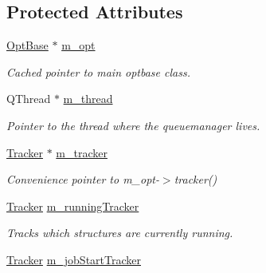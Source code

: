 \subsection*{Protected Attributes}
\begin{DoxyCompactItemize}
\item 
\hypertarget{classGlobalSearch_1_1QueueManager_a73408b74ae38d28709cc86211e569b66}{\hyperlink{classGlobalSearch_1_1OptBase}{Opt\-Base} $\ast$ \hyperlink{classGlobalSearch_1_1QueueManager_a73408b74ae38d28709cc86211e569b66}{m\-\_\-opt}}\label{classGlobalSearch_1_1QueueManager_a73408b74ae38d28709cc86211e569b66}

\begin{DoxyCompactList}\small\item\em Cached pointer to main optbase class. \end{DoxyCompactList}\item 
\hypertarget{classGlobalSearch_1_1QueueManager_aad3c44dad7c196ee965cdf4e1c66322c}{Q\-Thread $\ast$ \hyperlink{classGlobalSearch_1_1QueueManager_aad3c44dad7c196ee965cdf4e1c66322c}{m\-\_\-thread}}\label{classGlobalSearch_1_1QueueManager_aad3c44dad7c196ee965cdf4e1c66322c}

\begin{DoxyCompactList}\small\item\em Pointer to the thread where the queuemanager lives. \end{DoxyCompactList}\item 
\hypertarget{classGlobalSearch_1_1QueueManager_ab41f6210551ab04ed0518cd4f40d8e0d}{\hyperlink{classGlobalSearch_1_1Tracker}{Tracker} $\ast$ \hyperlink{classGlobalSearch_1_1QueueManager_ab41f6210551ab04ed0518cd4f40d8e0d}{m\-\_\-tracker}}\label{classGlobalSearch_1_1QueueManager_ab41f6210551ab04ed0518cd4f40d8e0d}

\begin{DoxyCompactList}\small\item\em Convenience pointer to m\-\_\-opt-\/$>$tracker() \end{DoxyCompactList}\item 
\hypertarget{classGlobalSearch_1_1QueueManager_af081fe2ea7f98693ae5a4cbc4246a812}{\hyperlink{classGlobalSearch_1_1Tracker}{Tracker} \hyperlink{classGlobalSearch_1_1QueueManager_af081fe2ea7f98693ae5a4cbc4246a812}{m\-\_\-running\-Tracker}}\label{classGlobalSearch_1_1QueueManager_af081fe2ea7f98693ae5a4cbc4246a812}

\begin{DoxyCompactList}\small\item\em Tracks which structures are currently running. \end{DoxyCompactList}\item 
\hypertarget{classGlobalSearch_1_1QueueManager_a1d9b17d2b9a12f6641282b9bab327046}{\hyperlink{classGlobalSearch_1_1Tracker}{Tracker} \hyperlink{classGlobalSearch_1_1QueueManager_a1d9b17d2b9a12f6641282b9bab327046}{m\-\_\-job\-Start\-Tracker}}\label{classGlobalSearch_1_1QueueManager_a1d9b17d2b9a12f6641282b9bab327046}


\end{DoxyCompactItemize}
